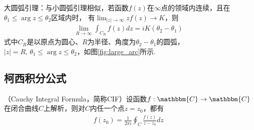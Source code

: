 \documentclass[lang=cn, titlestyle=display, scheme=chinese]{elegantbook}
\begin{document}
                \begin{lemma}
                    \label{lem:large_arc_lemma}
                    大圆弧引理：与小圆弧引理相似，若函数$f(z)$在$\infty$点的领域内连续，且在$\theta_1 \leq \arg{z} \leq \theta_2$区域内时，
                    有$\lim_{|z| \to \infty}zf(z) \to K$，则
                    \begin{align*}
                        \lim_{R \to \infty}\int_{C_R}f(z)dz = iK(\theta_2 - \theta_1)
                    \end{align*}
                    式中$C_R$是以原点为圆心、$R$为半径、角度为$\theta_2 - \theta_1$的圆弧，
                    $|z| = R,\,\theta_1 \leq \arg{z} \leq \theta_2$，如图\ref{fig:large_arc}所示.
                \end{lemma}

            \subsection{柯西积分公式}
                \begin{theorem}[Cauchy积分公式]\label{the:cauchy_integral_formula}
                    （Cauchy Integral Formula，简称CIF）设函数$f:\mathbbm{C} \to \mathbbm{C}$
                    在闭合曲线$C$上解析，则对$C$内任一个点$z = z_0$，都有
                    \begin{align*}
                        \label{eq:cauchy_integral_formula}
                        f(z_0) = \frac{1}{2 \pi i}\oint_{C}\frac{f(z)}{z - z_0}dz
                    \end{align*}
                \end{theorem}
\end{document}
